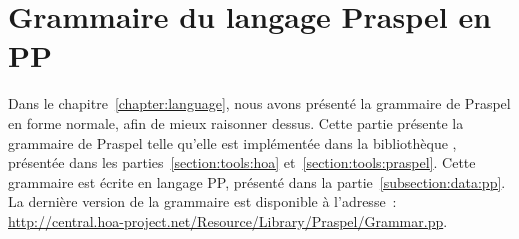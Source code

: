 \section{Grammaire du langage Praspel en PP}
\label{appendices:grammar_of_praspel}

Dans le chapitre~\ref{chapter:language}, nous avons présenté la grammaire de
Praspel en forme normale, afin de mieux raisonner dessus. Cette partie présente
la grammaire de Praspel telle qu'elle est implémentée dans la bibliothèque
, présentée dans les parties~\ref{section:tools:hoa}
et~\ref{section:tools:praspel}. Cette grammaire est écrite en langage PP,
présenté dans la partie~\ref{subsection:data:pp}. La dernière version de la
grammaire est disponible à l'adresse~:
\url{http://central.hoa-project.net/Resource/Library/Praspel/Grammar.pp}.

